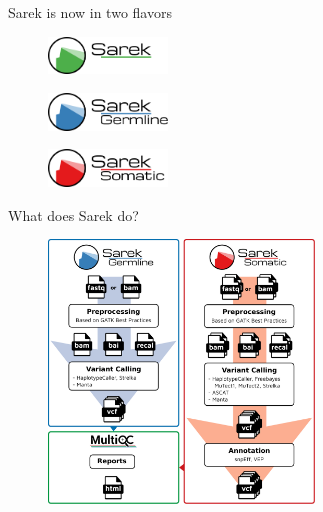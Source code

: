 \documentclass{beamer}
\begin{document}
\begin{frame}{Sarek is now in two flavors}
	\begin{figure}
		\includegraphics[height=1cm]{pictures/Sarek}
	\end{figure}
	\pause
	\begin{figure}
		\includegraphics[height=1cm]{pictures/Sarek_germline}
	\end{figure}
	\begin{figure}
		\includegraphics[height=1cm]{pictures/Sarek_somatic}
	\end{figure}
\end{frame}

\begin{frame}{What does Sarek do?}
	\begin{figure}
		\includegraphics[height=7cm]{pictures/Sarek_workflow}
	\end{figure}
\end{frame}
\end{document}
